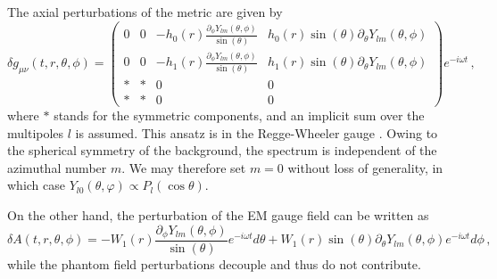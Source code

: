 \documentclass[11pt,a4paper]{article}
\begin{document}
The axial perturbations of the metric are given by
%
\begin{equation}\label{deltag_axial}
    \delta g_{\mu\nu}(t,r,\theta,\phi)=\begin{pmatrix}
0 & 0 & -h_0(r)\frac{\partial_{\phi}Y_{lm}(\theta,\phi)}{\sin{(\theta)}} & h_0(r)\sin{(\theta)}\partial_{\theta}Y_{lm}(\theta,\phi)\\
0 & 0 & -h_1(r)\frac{\partial_{\phi}Y_{lm}(\theta,\phi)}{\sin{(\theta)}} & h_1(r)\sin{(\theta)}\partial_
{\theta}
Y_{lm}(\theta,\phi)\\
* & * & 0 & 0\\
* & * & 0 & 0
\end{pmatrix}e^{-i\omega t} \,,
\end{equation}
%
where $*$ stands for the symmetric components, and an implicit sum over the multipoles $l$ is assumed. 
% 
This ansatz is in the Regge-Wheeler gauge \cite{Regge:1957td}.
Owing to the spherical symmetry of the background, the spectrum is independent of the azimuthal number $m$. 
We may therefore set $m=0$ without loss of generality, in which case $Y_{l0}(\theta,\varphi)\propto P_l(\cos\theta)$.

On the other hand, the perturbation of the EM gauge field can be written as
%
\begin{equation}
    \delta A(t,r,\theta,\phi)=-W_1(r)\frac{\partial_{\phi}Y_{lm}(\theta,\phi)}{\sin{(\theta)}}e^{-i\omega t}d\theta+W_1(r)\sin{(\theta)}\partial_{\theta}Y_{lm}(\theta,\phi)e^{-i\omega t}d\phi \,,
\end{equation}
while the phantom field perturbations decouple and thus do not contribute.
\end{document}
